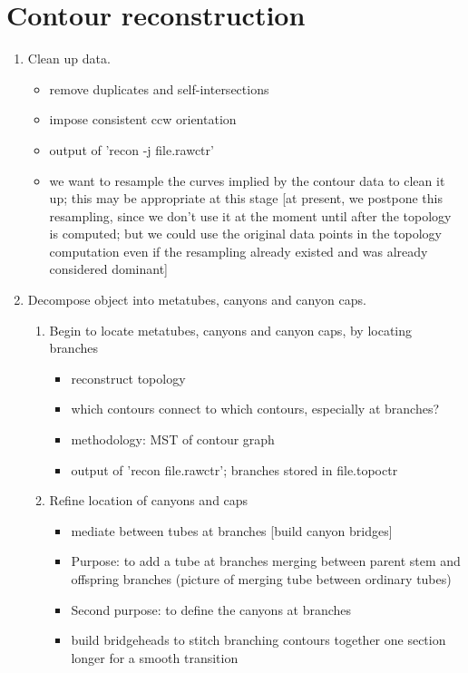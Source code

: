 \documentclass[11pt,titlepage]{article}
\begin{document}
\clearpage

\section{Contour reconstruction}

\begin{enumerate}
\item Clean up data.
\begin{itemize}
\item remove duplicates and self-intersections
\item impose consistent ccw orientation
\item output of 'recon -j file.rawctr'
\item we want to resample the curves implied by the contour data to clean it 
	up; this may be appropriate at this stage [at present, we postpone this
	resampling, since we don't use it at the moment until after the 
	topology is computed; but we could use the original data points
	in the topology computation even if the resampling already existed
	and was already considered dominant]
\end{itemize}
\item Decompose object into metatubes, canyons and canyon caps.
\begin{enumerate}
\item Begin to locate metatubes, canyons and canyon caps, by locating branches
\begin{itemize}
\item reconstruct topology
\item which contours connect to which contours, especially at branches?
\item methodology: MST of contour graph
\item output of 'recon file.rawctr'; branches stored in file.topoctr
\end{itemize}
\item Refine location of canyons and caps
\begin{itemize}
\item mediate between tubes at branches [build canyon bridges]
\item Purpose: to add a tube at branches merging between parent stem and
	offspring branches (picture of merging tube between ordinary tubes)
\item Second purpose: to define the canyons at branches
\item build bridgeheads to stitch branching contours together one section longer
	for a smooth transition

\end{itemize}
\end{enumerate}
\end{enumerate}
\end{document}
